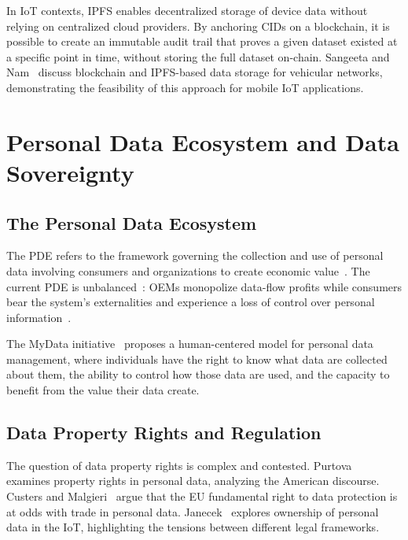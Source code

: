 In \ac{IoT} contexts, \ac{IPFS} enables decentralized storage of device data without relying on centralized cloud providers.
By anchoring \acp{CID} on a blockchain, it is possible to create an immutable audit trail that proves a given dataset existed at a specific point in time, without storing the full dataset on-chain.
Sangeeta and Nam~\cite{sangeeta:nam:2023} discuss blockchain and \ac{IPFS}-based data storage for vehicular networks, demonstrating the feasibility of this approach for mobile \ac{IoT} applications.

\section{Personal Data Ecosystem and Data Sovereignty}
\label{sec:pde}

\subsection{The Personal Data Ecosystem}
\label{subsec:pde-concept}

\noindent The \ac{PDE} refers to the framework governing the collection and use of personal data involving consumers and organizations to create economic value~\cite{world:economic:forum:2011}.
The current \ac{PDE} is unbalanced~\cite{ctrl:shift:2014}: \acp{OEM} monopolize data-flow profits while consumers bear the system's externalities and experience a loss of control over personal information~\cite{abiteboul:andre:abiteboul:2015}.

The MyData initiative~\cite{poikola:kuikkaniemi:honko:2015} proposes a human-centered model for personal data management, where individuals have the right to know what data are collected about them, the ability to control how those data are used, and the capacity to benefit from the value their data create.

\subsection{Data Property Rights and Regulation}
\label{subsec:data-rights}

The question of data property rights is complex and contested.
Purtova~\cite{purtova:2009} examines property rights in personal data, analyzing the American discourse.
Custers and Malgieri~\cite{custers:malgieri:2022} argue that the EU fundamental right to data protection is at odds with trade in personal data.
Janecek~\cite{janecek:2018} explores ownership of personal data in the \ac{IoT}, highlighting the tensions between different legal frameworks.

